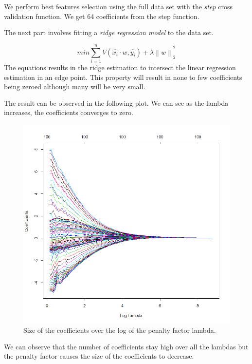 \documentclass[a4paper,12pt]{article}
\begin{document}
We perform best features selection using the full data set with the \textit{step}  cross validation function. We get 64 coefficients from the step function.

The next part involves fitting a \textit{ridge regression model} to the data set.

\begin{equation}
  min \sum_{i = 1}^n{V(\hat{x_i}\cdot w,\hat{y_i}) + \lambda\left \| w \right \|}^2_2
\end{equation}
The equations results in the ridge estimation to intersect the linear regression estimation in an edge point. This property will result in none to few coefficients being zeroed although many will be very small.

The result can be observed in the following plot. We can see as the lambda increases, the coefficients converges to zero.
\begin{figure}[H]
\centering
\begin{minipage}[]{0.75\textwidth}
  \includegraphics[width=\textwidth]{figures/Lab2A2_coef_ridge.png}  
  \caption{Size of the coefficients over the log of the penalty factor lambda.}
 \end{minipage}
\end{figure}
We can observe that the number of coefficients stay high over all the lambdas but the penalty factor causes the size of the coefficients to decrease.
\end{document}
